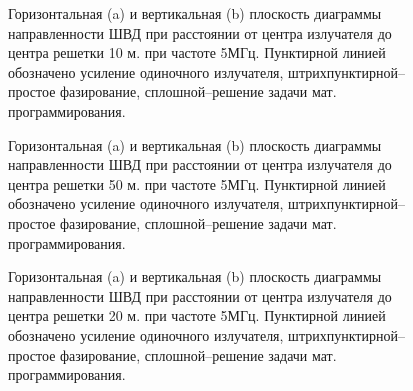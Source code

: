 \begin{figure}
\begin{minipage}[h]{0.49\linewidth}
\end{minipage}
\hfill
\begin{minipage}[h]{0.49\linewidth}
\end{minipage}
\caption{Горизонтальная (a) и вертикальная (b) плоскость диаграммы направленности ШВД при расстоянии от центра излучателя до центра решетки 10 м. при частоте 5МГц. Пунктирной линией обозначено усиление одиночного излучателя, штрихпунктирной--простое фазирование, сплошной--решение задачи мат. программирования.}
\label{ris:bvd_mut_5_10}
\end{figure}

\begin{figure}
\begin{minipage}[h]{0.49\linewidth}
\end{minipage}
\hfill
\begin{minipage}[h]{0.49\linewidth}
\end{minipage}
\caption{Горизонтальная (a) и вертикальная (b) плоскость диаграммы направленности ШВД при расстоянии от центра излучателя до центра решетки 50 м. при частоте 5МГц. Пунктирной линией обозначено усиление одиночного излучателя, штрихпунктирной--простое фазирование, сплошной--решение задачи мат. программирования.}
\label{ris:bvd_mut_5_50}
\end{figure}


\begin{figure}
\begin{minipage}[h]{0.49\linewidth}
\end{minipage}
\hfill
\begin{minipage}[h]{0.49\linewidth}
\end{minipage}
\caption{Горизонтальная (a) и вертикальная (b) плоскость диаграммы направленности ШВД при расстоянии от центра излучателя до центра решетки 20 м. при частоте 5МГц. Пунктирной линией обозначено усиление одиночного излучателя, штрихпунктирной--простое фазирование, сплошной--решение задачи мат. программирования.}
\label{ris:bvd_mut_5_20}
\end{figure}

